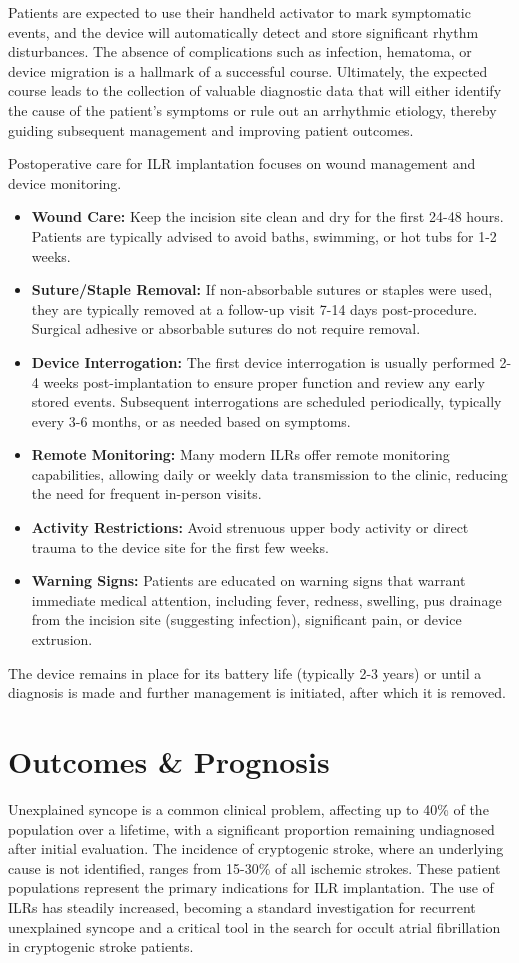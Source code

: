 Patients are expected to use their handheld activator to mark symptomatic events, and the device will automatically detect and store significant rhythm disturbances. The absence of complications such as infection, hematoma, or device migration is a hallmark of a successful course. Ultimately, the expected course leads to the collection of valuable diagnostic data that will either identify the cause of the patient's symptoms or rule out an arrhythmic etiology, thereby guiding subsequent management and improving patient outcomes.

Postoperative care for ILR implantation focuses on wound management and device monitoring.
\begin{itemize}
  \item \textbf{Wound Care:} Keep the incision site clean and dry for the first 24-48 hours. Patients are typically advised to avoid baths, swimming, or hot tubs for 1-2 weeks.
  \item \textbf{Suture/Staple Removal:} If non-absorbable sutures or staples were used, they are typically removed at a follow-up visit 7-14 days post-procedure. Surgical adhesive or absorbable sutures do not require removal.
  \item \textbf{Device Interrogation:} The first device interrogation is usually performed 2-4 weeks post-implantation to ensure proper function and review any early stored events. Subsequent interrogations are scheduled periodically, typically every 3-6 months, or as needed based on symptoms.
  \item \textbf{Remote Monitoring:} Many modern ILRs offer remote monitoring capabilities, allowing daily or weekly data transmission to the clinic, reducing the need for frequent in-person visits.
  \item \textbf{Activity Restrictions:} Avoid strenuous upper body activity or direct trauma to the device site for the first few weeks.
  \item \textbf{Warning Signs:} Patients are educated on warning signs that warrant immediate medical attention, including fever, redness, swelling, pus drainage from the incision site (suggesting infection), significant pain, or device extrusion.
\end{itemize}
The device remains in place for its battery life (typically 2-3 years) or until a diagnosis is made and further management is initiated, after which it is removed.

\section*{Outcomes \& Prognosis}
Unexplained syncope is a common clinical problem, affecting up to 40\% of the population over a lifetime, with a significant proportion remaining undiagnosed after initial evaluation. The incidence of cryptogenic stroke, where an underlying cause is not identified, ranges from 15-30\% of all ischemic strokes. These patient populations represent the primary indications for ILR implantation. The use of ILRs has steadily increased, becoming a standard investigation for recurrent unexplained syncope and a critical tool in the search for occult atrial fibrillation in cryptogenic stroke patients.

